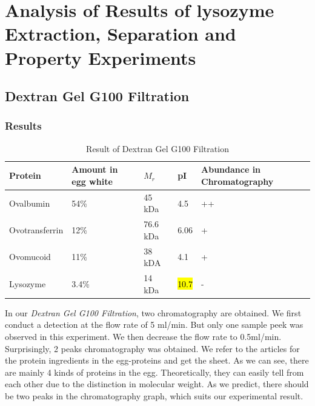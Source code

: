 % 
%
%
% 
%

\chapter{Analysis of Results of lysozyme Extraction, Separation and Property Experiments}

\hypertarget{header-n0}{%
	\section{Dextran Gel G100 Filtration}\label{header-n0}}

\subsection{Results}

\begin{table}[!h]
	\centering
	\caption{Result of Dextran Gel G100 Filtration}
	\begin{tabular}{@{}lllll@{}}
	\toprule
	Protein & Amount in egg white & \(M_{r}\) & pI & Abundance
	in Chromatography\\
	\midrule
	Ovalbumin & 54\% & 45 kDa & 4.5 & ++\\
	Ovotransferrin & 12\% & 76.6 kDa & 6.06 & +\\
	Ovomucoid & 11\% & 38 kDA & 4.1 & +\\
	Lysozyme & 3.4\% & 14 kDa & \hl{10.7} & -\\
	\bottomrule
	\end{tabular}
\end{table}

In our \emph{Dextran Gel G100 Filtration}, two chromatography are
obtained. We first conduct a detection at the flow rate of 5 ml/min. But
only one sample peek was observed in this experiment. We then decrease
the flow rate to 0.5ml/min. Surprisingly, 2 peaks chromatography was
obtained. We refer to the articles for the protein ingredients in the
egg-proteins and get the sheet. As we can see, there are mainly 4 kinds of
proteins in the egg. Theoretically, they can easily tell from each other
due to the distinction in molecular weight. As we predict, there should
be two peaks in the chromatography graph, which suits our experimental
result.

